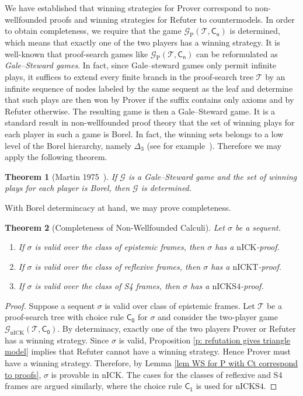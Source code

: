 \documentclass{myifcolog}
\newcommand{\hickp}{\mathrm{P}}
\newcommand{\nick}{\mathrm{nICK}}
\newcommand{\nickt}{\mathrm{nICKT}}
\newcommand{\nicks}{\mathrm{nICKS4}}
\newtheorem{theorem}{Theorem}
\numberwithin{theorem}{section}
\begin{document}
We have established that winning strategies for Prover correspond to non-wellfounded proofs and winning strategies for Refuter to countermodels. In order to obtain completeness, we require that the game $\mathcal{G}_\hickp(\mathcal{T}, \mathsf{C_n})$ is determined, which means that exactly one of the two players has a winning strategy. It is well-known that proof-search games like $\mathcal{G}_\hickp(\mathcal{T}, \mathsf{C_n})$ can be reformulated as \emph{Gale--Steward games}. In fact, since Gale--steward games only permit infinite plays, it suffices to extend every finite branch in the proof-search tree $\mathcal{T}$ by an infinite sequence of nodes labeled by the same sequent as the leaf and determine that such plays are then won by Prover if the suffix contains only axioms and by Refuter otherwise.  The resulting game is then a Gale--Steward game. It is a standard result in non-wellfounded proof theory that the set of winning plays for each player in such a game is Borel. In fact, the winning sets belongs to a low level of the Borel hierarchy, namely $\Delta_3$ (see for example~\cite{menendez_2024}). Therefore we may apply the following theorem.

\begin{theorem}[Martin 1975~\cite{Martin_1975}]
    If $\mathcal{G}$ is a Gale--Steward game and the set of winning plays for each player is Borel, then $\mathcal{G}$ is determined.
\end{theorem}

With Borel determincacy at hand, we may prove completeness.

\begin{theorem}[Completeness of Non-Wellfounded Calculi]\label{t: nonwellfounded completeness}
Let $\sigma$ be a sequent.
\begin{enumerate}
    \item If $\sigma$ is valid over the class of epistemic frames, then $\sigma$ has a $\nick$-proof.
    \item If $\sigma$ is valid over the class of reflexive frames, then $\sigma$ has a $\nickt$-proof.
    \item If $\sigma$ is valid over the class of S4 frames, then $\sigma$ has a $\nicks$-proof.
\end{enumerate}
\end{theorem}
\begin{proof}
   Suppose a sequent $\sigma$ is valid over class of epistemic frames. Let $\mathcal{T}$ be a proof-search tree with choice rule $\mathsf{C_0}$ for $\sigma$ and consider the two-player game $\mathcal{G}_\nick(\mathcal{T}, \mathsf{C_0})$. By determinacy, exactly one of the two players Prover or Refuter has a winning strategy. Since $\sigma$ is valid, Proposition \ref{p: refutation gives triangle model} implies that Refuter cannot have a winning strategy. Hence Prover must have a winning strategy. Therefore, by Lemma \ref{lem WS for P with Ct correspond to proofs}, $\sigma$ is provable in $\nick$. The cases for the classes of reflexive and S4 frames are argued similarly, where the choice rule $\mathsf{C_1}$ is used for $\nicks$.
\end{proof}
\end{document}
